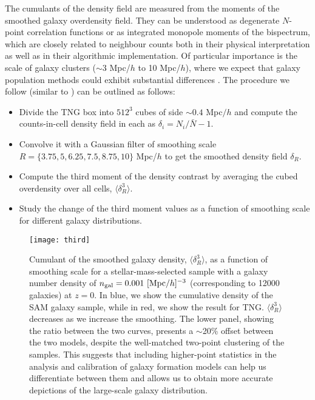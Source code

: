 \documentclass[fleqn,usenatbib]{mnras}
\newcommand{\rss}[1]{\textcolor{purple}{(rss: #1)}}
\begin{document}
The cumulants of the density field are measured from the moments of the smoothed galaxy overdensity field. They can be understood as degenerate $N$-point correlation functions or as integrated monopole moments of the bispectrum, which are closely related to neighbour counts both in their physical interpretation as well as in their algorithmic implementation. Of particular importance is the scale of galaxy clusters ($\sim$3 Mpc/$h$ to 10 Mpc/$h$), where we expect that galaxy population methods could exhibit substantial differences \citep{1994A&A...291..697B,1994MNRAS.268..913G}. The procedure we follow (similar to \citet{2021MNRAS.501.1603H}) can be outlined as follows:
\begin{itemize}
\item Divide the TNG box into $512^3$ cubes  of side $\sim 0.4$ Mpc$/h$ and compute the counts-in-cell density field in each as $\delta_i = N_i/{\bar N}-1$.
\item Convolve it with a Gaussian filter of smoothing scale $R = \{3.75, 5, 6.25, 7.5, 8.75, 10\}$ Mpc/$h$ to get the smoothed density field $\delta_R$.
\item Compute the third moment of the density contrast by averaging the cubed overdensity over all cells, $\langle \delta^3_R \rangle$.
\item Study the change of the third moment values as a function of smoothing scale for different galaxy distributions.
\end{itemize}

\begin{figure}
\centering  
\texttt{[image: third]}
\caption{Cumulant of the smoothed galaxy density, $\langle \delta^3_R \rangle$, as a function of smoothing scale for a stellar-mass-selected sample with a galaxy number density of $n_{\rm gal} = 0.001 \ [{\rm Mpc}/h]^{-3}$ (corresponding to 12000 galaxies) at $z = 0$. In blue, we show the cumulative density of the SAM galaxy sample, while in red, we show the result for TNG. $\langle \delta^3_R \rangle$ decreases as we increase the smoothing. The lower panel, showing the ratio between the two curves, presents a $\sim$20\% offset between the two models, despite the well-matched two-point clustering of the samples. This suggests that including higher-point statistics in the analysis and calibration of galaxy formation models can help us differentiate between them and allows us to obtain more accurate depictions of the large-scale galaxy distribution.
}
\label{fig:third}
\end{figure}
\end{document}
